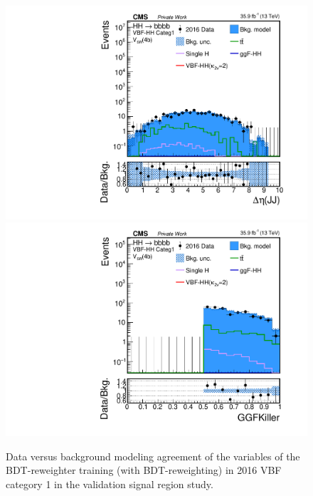 \begin{figure}[htbp!]
\begin{center}
\includegraphics[width=0.24\linewidth]{Figures/Modeling/background/plotsDatadrivenWithBDT/2016/VBFcateg1_SR_210/Histogram/plot2016_j1j2_deltaEta_Btag4_VBFcateg1_SR_210_Histogram_log.pdf}
\includegraphics[width=0.24\linewidth]{Figures/Modeling/background/plotsDatadrivenWithBDT/2016/VBFcateg1_SR_210/Histogram/plot2016_GGFKiller_Btag4_VBFcateg1_SR_210_Histogram_log.pdf}
\end{center}
\caption{Data versus background modeling agreement of the variables of the BDT-reweighter training (with BDT-reweighting) in 2016 VBF category 1 in the validation signal region study.}
\label{bkg:fig:valsrbdtregvarvbf1_2016}
\end{figure}


